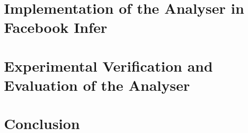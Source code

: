 \chapter{Implementation of the Analyser in Facebook Infer}
\label{chap:implementation}



\chapter{Experimental Verification and Evaluation of the Analyser}
\label{chap:experiments}



\chapter{Conclusion}
\label{chap:conclusion}


